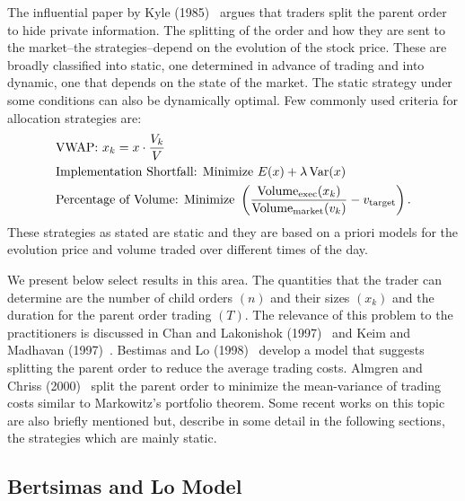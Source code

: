 The influential paper by Kyle (1985)~\cite{kyle1985} argues that traders split the parent order to hide private information. The splitting of the order and how they are sent to the market--the strategies--depend on the evolution of the stock price. These are broadly classified into static, one determined in advance of trading and into dynamic, one that depends on the state of the market. The static strategy under some conditions can also be dynamically optimal. Few commonly used criteria for allocation strategies are:
	\[
	\begin{split}
	&\text{VWAP: } x_k= x \cdot \dfrac{V_k}{V} \\
	&\text{Implementation Shortfall: Minimize }E(x)+\lambda \operatorname{Var}(x) \\
	&\text{Percentage of Volume: Minimize }\left(\dfrac{\text{Volume}_{\text{exec}}(x_k)}{\text{Volume}_{\text{market}}(v_k)} - v_{\text{target}}\right).
	\end{split}
	\]
These strategies as stated are static and they are based on a priori models for the evolution price and volume traded over different times of the day. 


We present below select results in this area. The quantities that the trader can determine are the number of child orders $(n)$ and their sizes $(x_k)$ and the duration for the parent order trading $(T)$. The relevance of this problem to the practitioners is discussed in Chan and Lakonishok (1997)~\cite{lakon} and Keim and Madhavan (1997)~\cite{madhavan}. Bestimas and Lo (1998)~\cite{berlo} develop a model that suggests splitting the parent order to reduce the average trading costs. Almgren and Chriss (2000)~\cite{alm2000} split the parent order to minimize the mean-variance of trading costs similar to Markowitz's portfolio theorem. Some recent works on this topic are also briefly mentioned but, describe in some detail in the following sections, the strategies which are mainly static. 



\subsection{Bertsimas and Lo Model}

